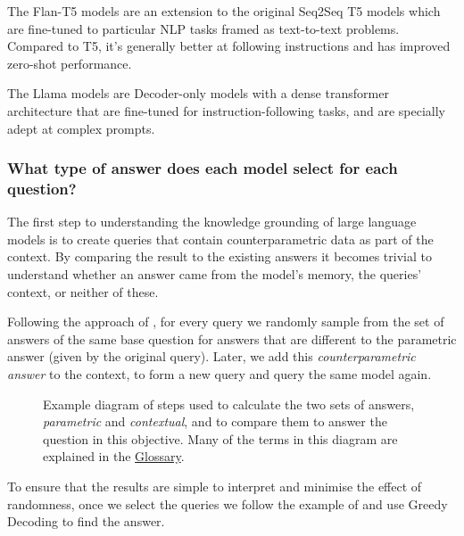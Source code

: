 The Flan-T5 models \citep{flant5} are an extension to the original Seq2Seq T5 models \citep{t5} which are fine-tuned to particular NLP tasks framed as text-to-text problems.
Compared to T5, it's generally better at following instructions and has improved zero-shot performance.

The Llama models \citep{llama3} are Decoder-only models with a dense transformer architecture that are fine-tuned for instruction-following tasks, and are specially adept at complex prompts.

\subsubsection{What type of answer does each model select for each question?}

The first step to understanding the knowledge grounding of large language models is to create queries that contain counterparametric data as part of the context.
By comparing the result to the existing answers it becomes trivial to understand whether an answer came from the model's memory, the queries' context, or neither of these.

Following the approach of \citeauthor{factual_recall}, for every query we randomly sample from the set of answers of the same base question for answers that are different to the parametric answer (given by the original query).
Later, we add this \emph{counterparametric answer} to the context, to form a new query and query the same model again.

\begin{figure}[ht]
	\centering
	\caption{Example diagram of steps used to calculate the two sets of answers, \textit{parametric} and \textit{contextual}, and to compare them to answer the question in this objective. Many of the terms in this diagram are explained in the \protect\hyperref[glossary]{Glossary}.}
	\label{action_diagram}
\end{figure}

To ensure that the results are simple to interpret and minimise the effect of randomness, once we select the queries we follow the example of \citeauthor{ragged} and use Greedy Decoding to find the answer.


